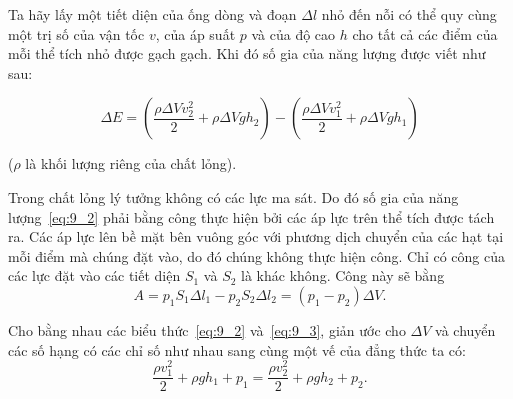 
Ta hãy lấy một tiết diện của ống dòng và đoạn $\Delta l$ nhỏ đến nỗi có thể quy cùng một trị số của vận tốc $v$, của áp suất $p$ và của độ cao $h$ cho tất cả các điểm của mỗi thể tích nhỏ được gạch gạch. Khi đó số gia của năng lượng được viết như sau:

\begin{equation}\label{eq:9_2}
	\Delta E = \left(\frac{\rho\Delta V v_2^2}{2} + \rho\Delta V gh_2\right) - \left(\frac{\rho\Delta V v_1^2}{2} + \rho\Delta V gh_1\right)
\end{equation}

\noindent

($\rho$ là khối lượng riêng của chất lỏng).


Trong chất lỏng lý tưởng không có các lực ma sát. Do đó số gia của năng lượng~\eqref{eq:9_2} phải bằng công thực hiện bởi các áp lực trên thể tích được tách ra. Các áp lực lên bề mặt bên vuông góc với phương dịch chuyển của các hạt tại mỗi điểm mà chúng đặt vào, do đó chúng không thực hiện công. Chỉ có công của các lực đặt vào các tiết diện $S_1$ và $S_2$ là khác không. Công này sẽ bằng
\begin{equation}\label{eq:9_3}
	A = p_1 S_1 \Delta l_1 - p_2 S_2 \Delta l_2 = (p_1 - p_2)\Delta V.
\end{equation}

Cho bằng nhau các biểu thức~\eqref{eq:9_2} và~\eqref{eq:9_3}, giản ước cho $\Delta V$ và chuyển các số hạng có các chỉ số như nhau sang cùng một vế của đẳng thức ta có:
\begin{equation}\label{eq:9_4}
	\frac{\rho v_1^2}{2} + \rho gh_1 + p_1 = \frac{\rho v_2^2}{2} + \rho gh_2 + p_2.
\end{equation}

